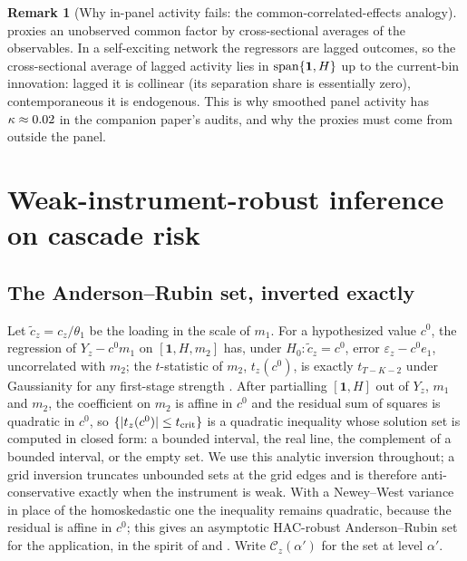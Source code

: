 \documentclass[12pt]{article}
\theoremstyle{plain}\newtheorem{theorem}{Theorem}[section]\newtheorem{proposition}[theorem]{Proposition}\newtheorem{lemma}[theorem]{Lemma}\newtheorem{corollary}[theorem]{Corollary}
\theoremstyle{definition}\newtheorem{definition}[theorem]{Definition}\newtheorem{assumption}[theorem]{Assumption}\newtheorem{remark}[theorem]{Remark}
\begin{document}
\begin{remark}[Why in-panel activity fails: the common-correlated-effects analogy]\label{rem:cce}
\citet{pesaran2006} proxies an unobserved common factor by cross-sectional averages of the observables. In a self-exciting network the regressors are lagged outcomes, so the cross-sectional average of lagged activity lies in $\operatorname{span}\{\mathbf 1,H\}$ up to the current-bin innovation: lagged it is collinear (its separation share is essentially zero), contemporaneous it is endogenous. This is why smoothed panel activity has $\kappa\approx0.02$ in the companion paper's audits, and why the proxies must come from outside the panel.
\end{remark}

\section{Weak-instrument-robust inference on cascade risk}\label{sec:ar}
\subsection{The Anderson--Rubin set, inverted exactly}
Let $\tilde c_z=c_z/\theta_1$ be the loading in the scale of $m_1$. For a hypothesized value $c^0$, the regression of $Y_z-c^0m_1$ on $[\mathbf 1,H,m_2]$ has, under $H_0:\tilde c_z=c^0$, error $\varepsilon_z-c^0e_1$, uncorrelated with $m_2$; the $t$-statistic of $m_2$, $t_z(c^0)$, is exactly $t_{T-K-2}$ under Gaussianity for any first-stage strength \citep{anderson1949}. After partialling $[\mathbf 1,H]$ out of $Y_z$, $m_1$ and $m_2$, the coefficient on $m_2$ is affine in $c^0$ and the residual sum of squares is quadratic in $c^0$, so $\{|t_z(c^0)|\le t_{\rm crit}\}$ is a quadratic inequality whose solution set is computed in closed form: a bounded interval, the real line, the complement of a bounded interval, or the empty set. We use this analytic inversion throughout; a grid inversion truncates unbounded sets at the grid edges and is therefore anti-conservative exactly when the instrument is weak. With a Newey--West variance in place of the homoskedastic one the inequality remains quadratic, because the residual is affine in $c^0$; this gives an asymptotic HAC-robust Anderson--Rubin set for the application, in the spirit of \citet{montielolea2013} and \citet{andrews2019}. Write $\mathcal C_z(\alpha')$ for the set at level $\alpha'$.
\end{document}
